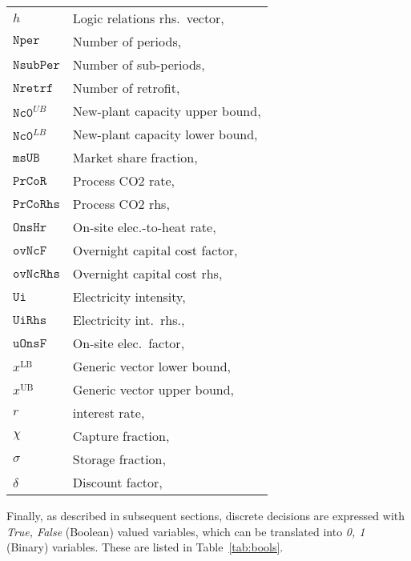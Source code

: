 \documentclass{amsart}
\begin{document}
\begin{longtable}[c]{@{}ll@{}}
    $h$ & Logic relations rhs.\ vector,\\
    $\mathtt{Nper}$	& Number of periods, \\
    $\mathtt{NsubPer}$	& Number of sub-periods, \\
    $\mathtt{Nretrf}$	& Number of retrofit, \\
    $\mathtt{Nc0}^{UB}$	& New-plant capacity upper bound, \\
    $\mathtt{Nc0}^{LB}$	& New-plant capacity lower bound, \\
    $\mathtt{msUB}$ & Market share fraction, \\
    $\mathtt{PrCoR}$	& Process CO2 rate, \\
    $\mathtt{PrCoRhs}$	& Process CO2 rhs, \\
    $\mathtt{OnsHr}$	& On-site elec.-to-heat rate, \\
    $\mathtt{ovNcF}$	& Overnight capital cost factor, \\
    $\mathtt{ovNcRhs}$	& Overnight capital cost rhs, \\
    $\mathtt{Ui}$	& Electricity intensity, \\
    $\mathtt{UiRhs}$	& Electricity int.\ rhs., \\
    $\mathtt{uOnsF}$	& On-site elec.\ factor, \\
    $x^{\text{LB}}$ & Generic vector lower bound,\\
    $x^{\text{UB}}$ & Generic vector upper bound,\\
    $r$	& interest rate, \\
    $\chi$	& Capture fraction, \\
    $\sigma$	& Storage fraction, \\
    $\delta$ & Discount factor, \\
\end{longtable}
%
Finally, as described in subsequent sections, discrete decisions are expressed
with \emph{True, False} (Boolean) valued variables, which can be translated into
\emph{0, 1} (Binary) variables. These are listed in Table~\ref{tab:bools}.
%
\end{document}
